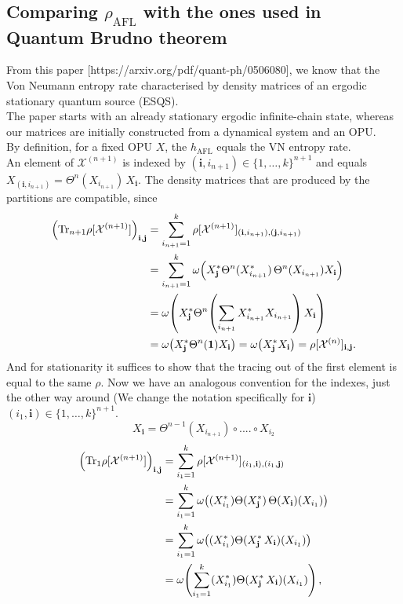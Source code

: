 \documentclass{article}
\newcommand{\afl}{h_{\text{AFL}}}
\newcommand{\rafl}{\rho_{\text{AFL}}}
\begin{document}
\subsection{Comparing $\rafl$ with the ones used in Quantum Brudno theorem}
From this paper [https://arxiv.org/pdf/quant-ph/0506080], we know that the Von Neumann entropy rate characterised by density matrices of an ergodic stationary quantum source (ESQS). \\
The paper starts with an already stationary ergodic infinite-chain state, whereas our matrices are initially constructed from a dynamical system and an OPU.\\
By definition, for a fixed OPU $X$, the $\afl$ equals the VN entropy rate.\\

An element of $\mathcal{X}^{(n+1)}$ is indexed by
$(\mathbf{i},i_{n+1})\in\{1,\ldots,k\}^{n+1}$ and equals
$X_{(\mathbf{i},i_{n+1})} = \Theta^n(X_{i_{n+1}})\,X_{\mathbf{i}}$.
The density matrices that are produced by the partitions are compatible, since
\begin{align*}
\left(\text{Tr}_{n+1}\rho[\mathcal{X}^{(n+1)}]\right)_{\mathbf{i},\mathbf{j}}
  &= \sum_{i_{n+1}=1}^k \rho[\mathcal{X}^{(n+1)}]_{(\mathbf{i},i_{n+1}),(\mathbf{j},i_{n+1})} \\
  &= \sum_{i_{n+1}=1}^k \omega\!\left(X_{\mathbf{j}}^*\Theta^n(X_{i_{n+1}}^*)\,\Theta^n(X_{i_{n+1}})
     X_{\mathbf{i}}\right) \\
  &= \omega\!\left(X_{\mathbf{j}}^*
     \Theta^n\!\left(\sum_{i_{n+1}}X_{i_{n+1}}^* X_{i_{n+1}}\right)
     X_{\mathbf{i}}\right) \\
  &= \omega\!\left(X_{\mathbf{j}}^*\Theta^n(\mathbf{1})X_{\mathbf{i}}\right)
   = \omega\!\left(X_{\mathbf{j}}^* X_{\mathbf{i}}\right)
   = \rho[\mathcal{X}^{(n)}]_{\mathbf{i},\mathbf{j}}.
\end{align*}
And for stationarity it suffices to show that the tracing out of the first element is equal to the same $\rho$. Now we have an analogous convention for the indexes, just the other way around (We change the notation specifically for $\mathbf{i}$) $(i_{1},\mathbf{i})\in\{1,\ldots,k\}^{n+1}$. 
\begin{equation}
    X_\mathbf{i} = \Theta^{n-1}(X_{i_{n+1}})\circ....\circ X_{i_{2}}
\end{equation}
\begin{align*}
\left(\text{Tr}_{1}\rho[\mathcal{X}^{(n+1)}]\right)_{\mathbf{i},\mathbf{j}}
  &= \sum_{i_1=1}^k \rho[\mathcal{X}^{(n+1)}]_{(i_{1},\mathbf{i}),(i_{1}, \mathbf{j})} \\
  &= \sum_{i_1=1}^k \omega\!\left((X_{i_1}^*)\Theta(X_{\mathbf{j}}^*)\,
     \Theta(X_{\mathbf{i}})(X_{i_1})\right)\\
  &= 
   \sum_{i_1=1}^k \omega\!\left((X_{i_1}^*)\Theta(X_{\mathbf{j}}^*\,
     X_{\mathbf{i}})(X_{i_1})\right)\\
  &=  \omega\!\left(\sum_{i_1=1}^k(X_{i_1}^*)\Theta(X_{\mathbf{j}}^*\,
     X_{\mathbf{i}})(X_{i_1})\right),
\end{align*}
\end{document}
